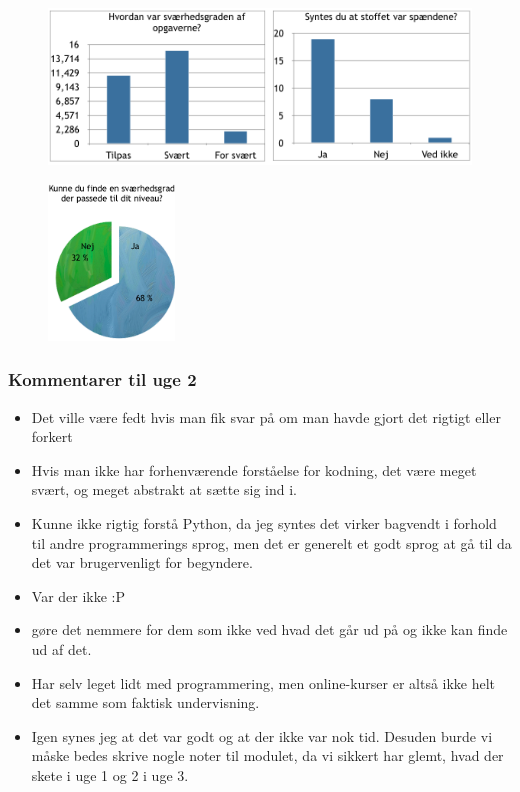 \documentclass{article}
\begin{document}
    \begin{figure}[h!]
        \centering
        \includegraphics[width=1\textwidth]{include/uge2-2.png}
    \end{figure}
    \vspace{-1em}
    \begin{figure}[h!]
        \centering
        \includegraphics[width=0.3\textwidth]{include/uge2-3.png}
    \end{figure}


    \subsubsection{Kommentarer til uge 2}
    \begin{itemize}
        \item Det ville være fedt hvis man fik svar på om man havde gjort det
              rigtigt eller forkert

        \item Hvis man ikke har forhenværende forståelse for kodning, det være
              meget svært, og meget abstrakt at sætte sig ind i.

        \item Kunne ikke rigtig forstå Python, da jeg syntes det virker bagvendt
              i forhold til andre programmerings sprog, men det er generelt et
              godt sprog at gå til da det var brugervenligt for begyndere.

        \item Var der ikke :P

        \item gøre det nemmere for dem som ikke ved hvad det går ud på og ikke
              kan finde ud af det.

        \item Har selv leget lidt med programmering, men online-kurser er altså
              ikke helt det samme som faktisk undervisning.

        \item Igen synes jeg at det var godt og at der ikke var nok tid.
              Desuden burde vi måske bedes skrive nogle noter til modulet,
              da vi sikkert har glemt, hvad der skete i uge 1 og 2 i uge 3.
    \end{itemize}
\newpage
\end{document}
